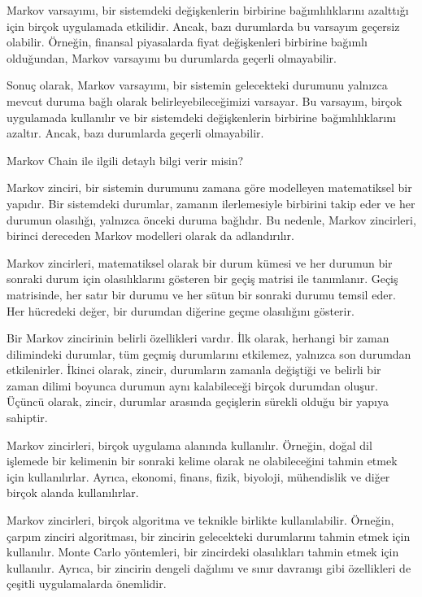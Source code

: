 \documentclass[11pt]{article}
\begin{document}
Markov varsayımı, bir sistemdeki değişkenlerin birbirine bağımlılıklarını azalttığı için birçok uygulamada etkilidir. Ancak, bazı durumlarda bu varsayım geçersiz olabilir. Örneğin, finansal piyasalarda fiyat değişkenleri birbirine bağımlı olduğundan, Markov varsayımı bu durumlarda geçerli olmayabilir.

Sonuç olarak, Markov varsayımı, bir sistemin gelecekteki durumunu yalnızca mevcut duruma bağlı olarak belirleyebileceğimizi varsayar. Bu varsayım, birçok uygulamada kullanılır ve bir sistemdeki değişkenlerin birbirine bağımlılıklarını azaltır. Ancak, bazı durumlarda geçerli olmayabilir.

Markov Chain  ile ilgili detaylı bilgi verir misin?

Markov zinciri, bir sistemin durumunu zamana göre modelleyen matematiksel bir yapıdır. Bir sistemdeki durumlar, zamanın ilerlemesiyle birbirini takip eder ve her durumun olasılığı, yalnızca önceki duruma bağlıdır. Bu nedenle, Markov zincirleri, birinci dereceden Markov modelleri olarak da adlandırılır.

Markov zincirleri, matematiksel olarak bir durum kümesi ve her durumun bir sonraki durum için olasılıklarını gösteren bir geçiş matrisi ile tanımlanır. Geçiş matrisinde, her satır bir durumu ve her sütun bir sonraki durumu temsil eder. Her hücredeki değer, bir durumdan diğerine geçme olasılığını gösterir.

Bir Markov zincirinin belirli özellikleri vardır. İlk olarak, herhangi bir zaman dilimindeki durumlar, tüm geçmiş durumlarını etkilemez, yalnızca son durumdan etkilenirler. İkinci olarak, zincir, durumların zamanla değiştiği ve belirli bir zaman dilimi boyunca durumun aynı kalabileceği birçok durumdan oluşur. Üçüncü olarak, zincir, durumlar arasında geçişlerin sürekli olduğu bir yapıya sahiptir.

Markov zincirleri, birçok uygulama alanında kullanılır. Örneğin, doğal dil işlemede bir kelimenin bir sonraki kelime olarak ne olabileceğini tahmin etmek için kullanılırlar. Ayrıca, ekonomi, finans, fizik, biyoloji, mühendislik ve diğer birçok alanda kullanılırlar.

Markov zincirleri, birçok algoritma ve teknikle birlikte kullanılabilir. Örneğin, çarpım zinciri algoritması, bir zincirin gelecekteki durumlarını tahmin etmek için kullanılır. Monte Carlo yöntemleri, bir zincirdeki olasılıkları tahmin etmek için kullanılır. Ayrıca, bir zincirin dengeli dağılımı ve sınır davranışı gibi özellikleri de çeşitli uygulamalarda önemlidir.
\end{document}
